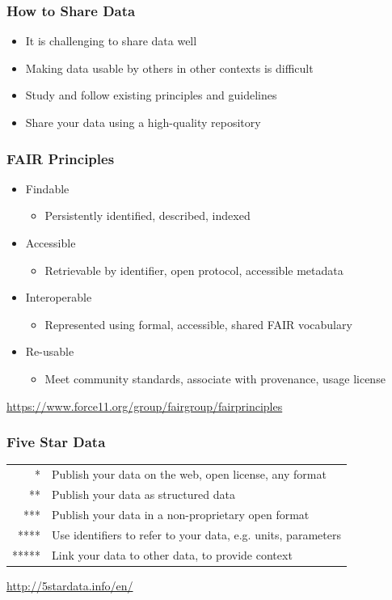 \documentclass{beamer}
\begin{document}
\begin{frame}
  \frametitle{How to Share Data}
  
  \begin{itemize}
  \item It is challenging to share data well
  \item Making data usable by others in other contexts is difficult
  \item Study and follow existing principles and guidelines
  \item Share your data using a high-quality repository
  \end{itemize}
\end{frame}

\begin{frame}
  \frametitle{FAIR Principles}
  
  \begin{itemize}
  \item Findable
  \begin{itemize}
  \item Persistently identified, described, indexed
  \end{itemize}
  \item Accessible
  \begin{itemize}
  \item Retrievable by identifier, open protocol, accessible metadata
  \end{itemize}
  \item Interoperable
  \begin{itemize}
  \item Represented using formal, accessible, shared FAIR vocabulary
  \end{itemize}
  \item Re-usable
  \begin{itemize}
  \item Meet community standards, associate with provenance, usage license
  \end{itemize}
  \end{itemize}
  \tiny
  \begin{flushright}
  \url{https://www.force11.org/group/fairgroup/fairprinciples}
  \end{flushright}
\end{frame}

\begin{frame}
  \frametitle{Five Star Data}
  
  \begin{tabular}{rl}
  * & Publish your data on the web, open license, any format \\
  ** & Publish your data as structured data \\
  *** & Publish your data in a non-proprietary open format\\
  **** & Use identifiers to refer to your data, e.g. units, parameters \\
  ***** & Link your data to other data, to provide context \\
  \end{tabular}
  \tiny
  \begin{flushright}
  \url{http://5stardata.info/en/}
  \end{flushright}
\end{frame}
\end{document}
